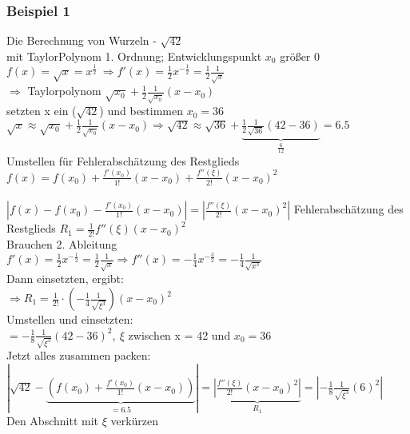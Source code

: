 \documentclass[12pt,a4paper]{article}
\renewenvironment{shaded}{%
	\def\FrameCommand{\fboxsep=\FrameSep \colorbox{shadecolor}}%
	\MakeFramed{\advance\hsize-\width \FrameRestore\FrameRestore}}%
{\endMakeFramed}
\begin{document}
\subsubsection{Beispiel 1}
Die Berechnung von Wurzeln - $\sqrt{42}$\\
mit TaylorPolynom 1. Ordnung; Entwicklungspunkt $x_0$ größer 0\\
$f(x)=\sqrt{x}=x^{\frac{1}{2}}\ \Rightarrow f'(x)=\frac{1}{2}x^{-\frac{1}{2}}=\frac{1}{2}\frac{1}{\sqrt{x}}$\\
$\Rightarrow$ Taylorpolynom $\sqrt{x_0}+\frac{1}{2}\frac{1}{\sqrt{x_0}}\left(x-x_0\right)$\\
setzten x ein ($\sqrt{42}$) und bestimmen $x_0 = 36$\\
$\sqrt{x}\approx\sqrt{x_0}+\frac{1}{2}\frac{1}{\sqrt{x_0}}\left(x-x_0\right)\Rightarrow\sqrt{42}\approx\sqrt{36}+\underbrace{\frac{1}{2}\frac{1}{\sqrt{36}}\left(42-36\right)}_{\frac{6}{12}}=6.5$\\
Umstellen für Fehlerabschätzung des Restglieds
\begin{shaded}
	$f(x)=f(x_0)+\frac{f'(x_0)}{1!}\left(x-x_0\right)+\frac{f''(\xi)}{2!}\left(x-x_0\right)^2$\\
	\\
	$\left|f(x)-f(x_0)-\frac{f'(x_0)}{1!}\left(x-x_0\right)\right|=\left|\frac{f''(\xi)}{2!}\left(x-x_0\right)^2\right|$
\end{shaded}
Fehlerabschätzung des Restglieds 
$R_1=\frac{1}{2!}f''(\xi)\left(x-x_0\right)^2$\\
Brauchen 2. Ableitung\\
$f'(x)=\frac{1}{2}x^{-\frac{1}{2}}=\frac{1}{2}\frac{1}{\sqrt{x}}\Rightarrow f''(x)=-\frac{1}{4}x^{-\frac{3}{2}}=-\frac{1}{4}\frac{1}{\sqrt{x^3}}$\\
Dann einsetzten, ergibt:\\
$\Rightarrow R_1=\frac{1}{2!}\cdot\left(-\frac{1}{4}\frac{1}{\sqrt{\xi^3}}\right)\left(x-x_0\right)^2$\\
Umstellen und einsetzten:\\
$=-\frac{1}{8}\frac{1}{\sqrt{\xi^3}}\left(42-36\right)^2,\ \xi$ zwischen x = 42 und $x_0 = 36$\\
Jetzt alles zusammen packen:\\
$\left|\sqrt{42}-\underbrace{\left(f(x_0)+\frac{f'(x_0)}{1!}\left(x-x_0\right)\right)}_{=6.5}\right|=\underbrace{\left|\frac{f''(\xi)}{2!}\left(x-x_0\right)^2\right|}_{R_1}=\left|-\frac{1}{8}\frac{1}{\sqrt{\xi^3}}(6)^2\right|$\\
\newpage
Den Abschnitt mit $\xi$ verkürzen\\
\end{document}
